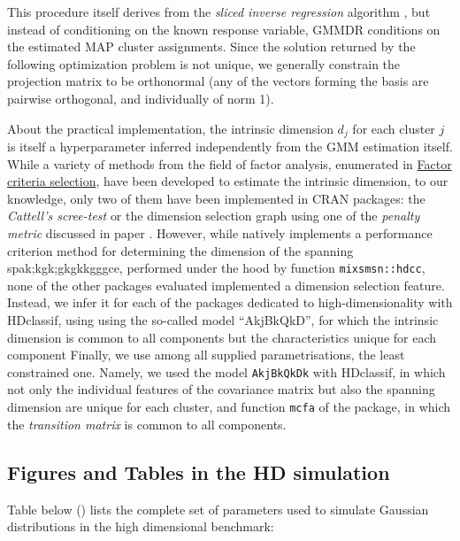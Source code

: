This procedure itself derives from the \emph{sliced inverse regression} algorithm \autocite{li91}, but instead of conditioning on the known response variable, GMMDR conditions on the estimated MAP cluster assignments. Since the solution returned by the following optimization problem is not unique, we generally constrain the projection matrix to be orthonormal (any of the vectors forming the basis are pairwise orthogonal, and individually of norm 1).

About the practical implementation, the intrinsic dimension \(d_j\) for each cluster \(j\) is itself a hyperparameter inferred independently from the GMM estimation itself. While a variety of methods from the field of factor analysis, enumerated in \href{https://en.wikipedia.org/wiki/Factor_analysis\#Criteria_for_determining_the_number_of_factors}{Factor criteria selection}, have been developed to estimate the intrinsic dimension, to our knowledge, only two of them have been implemented in CRAN packages: the \emph{Cattell's scree-test} \autocite{cattell66} or the dimension selection graph using one of the \emph{penalty metric} discussed in paper \autocite{berge_etal12}. However, while  natively implements a performance criterion method for determining the dimension of the spanning spak;kgk;gkgkkgggce, performed under the hood by function \texttt{mixsmsn::hdcc}, none of the other packages evaluated implemented a dimension selection feature. Instead, we infer it for each of the packages dedicated to high-dimensionality with HDclassif, using using the so-called model ``AkjBkQkD'', for which the intrinsic dimension is common to all components but the characteristics unique for each component Finally, we use among all supplied parametrisations, the least constrained one. Namely, we used the model \texttt{AkjBkQkDk} with HDclassif, in which not only the individual features of the covariance matrix but also the spanning dimension are unique for each cluster, and function \texttt{mcfa} of the  package, in which the \emph{transition matrix} is common to all components.


\subsection{Figures and Tables in the HD simulation}
\label{figures-hd-simulation}

Table below () lists the complete set of parameters used to simulate Gaussian distributions in the high dimensional benchmark:

